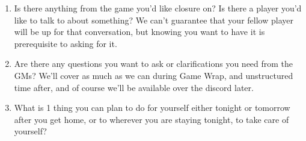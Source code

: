 \documentclass[green]{GL2020}
\begin{document}
\begin{enumerate}
\begin{enumerate}
		\item Is there anything from the game you’d like closure on? Is there a player you’d like to talk to about something? We can’t guarantee that your fellow player will be up for that conversation, but knowing you want to have it is prerequisite to asking for it.
		\item Are there any questions you want to ask or clarifications you need from the GMs? We’ll cover as much as we can during Game Wrap, and unstructured time after, and of course we’ll be available over the discord later.
		\item What is 1 thing you can plan to do for yourself either tonight or tomorrow after you get home, or to wherever you are staying tonight, to take care of yourself?
	\end{enumerate}
\end{enumerate}
\end{document}
